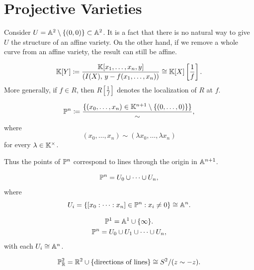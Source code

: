 
\section{Projective Varieties}

Consider $U = \aa^2\setminus\{(0,0)\}\subset \aa^2$.
It is a fact that there is no natural way to give $U$ the structure of an affine variety.
On the other hand, if we remove a whole curve from an affine variety, the result can still be affine.

\begin{definition}[Localization]
    \[
        \kk[Y]
        \coloneqq \frac{\kk[x_1,\ldots,x_n,y]}{(I(X),\, y - f(x_1,\ldots,x_n))}
        \cong \kk[X]\left[\frac{1}{f}\right].
    \]
    More generally, if $f\in R$, then $R\left[\frac{1}{f}\right]$ denotes the localization of $R$ at $f$.
\end{definition}

\begin{definition}[$\pp^n$]
    \[
        \pp^n
        \coloneqq
        \frac{\{(x_0,\ldots,x_n)\in \kk^{n+1}\setminus\{(0,\ldots,0)\}\}}{\sim},
    \]
    where
    \[
        (x_0,\ldots,x_n)\sim (\lambda x_0,\ldots,\lambda x_n)
    \]
    for every $\lambda\in \kk^\times$.

    Thus the points of $\pp^n$ correspond to lines through the origin in $\aa^{n+1}$.
\end{definition}

\begin{lemma*}{
    \[
        \pp^n = U_0\cup\cdots\cup U_n,
    \]
    where
    \[
        U_i = \{[x_0:\cdots:x_n]\in \pp^n : x_i\neq 0\}\cong \aa^n.
    \]
}
\end{lemma*}

\begin{gather*}
    \pp^1 = \aa^1\cup\{\infty\}.\\
    \pp^n = U_0\cup U_1\cup\cdots\cup U_n,\\
\end{gather*}
with each $U_i\cong \aa^n$.

\[
    \pp^2_{\rr} = \rr^2 \cup \{\text{directions of lines}\} \cong S^2/(z\sim -z).
\]

